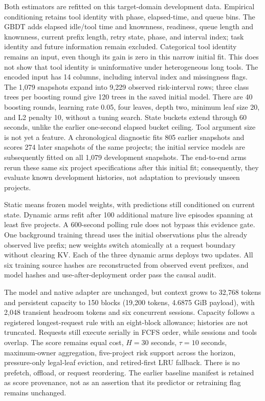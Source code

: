 \documentclass[sigconf, screen, review, balance=false]{acmart}
\begin{document}
Both estimators are refitted on this target-domain development data.
Empirical conditioning retains tool identity with phase, elapsed-time,
and queue bins. The GBDT adds elapsed idle/tool time and knownness,
readiness, queue length and knownness, current prefix length, retry
state, phase, and interval index; task identity and future information
remain excluded. Categorical tool identity remains an input, even
though its gain is zero in this narrow initial fit. This does not show
that tool identity is uninformative under heterogeneous long tools.
The encoded input has 14 columns, including interval index and
missingness flags. The 1,079 snapshots expand into 9,229 observed
risk-interval rows; three class trees per boosting round give
120 trees in the saved initial model.
There are 40 boosting rounds, learning rate 0.05, four leaves, depth two,
minimum leaf size 20, and L2 penalty 10, without a tuning search.
State buckets extend through 60 seconds, unlike the earlier
one-second elapsed bucket ceiling. Tool argument size is not yet a
feature. A chronological diagnostic fits 805 earlier snapshots and
scores 274 later snapshots of the same projects; the initial service
models are subsequently fitted on all 1,079 development snapshots.
The end-to-end arms rerun these same six project specifications after
this initial fit; consequently, they evaluate known development
histories, not adaptation to previously unseen projects.

Static means frozen model weights, with predictions still conditioned
on current state. Dynamic arms refit after 100 additional mature live
episodes spanning at least five projects. A 600-second polling rule
does not bypass this evidence gate. One background training thread uses
the initial observations plus the already observed live prefix; new
weights switch atomically at a request boundary without clearing KV.
Each of the three dynamic arms deploys two updates. All six training
source hashes are reconstructed from observed event prefixes, and
model hashes and use-after-deployment order pass the causal audit.

The model and native adapter are unchanged, but context grows to 32,768
tokens and persistent capacity to 150 blocks (19,200 tokens, 4.6875 GiB
payload), with 2,048 transient headroom tokens and six concurrent
sessions. Capacity follows a registered longest-request rule with an
eight-block allowance; histories are not truncated. Requests still
execute serially in FCFS order, while sessions and tools overlap.
The score remains equal cost, \(H=30\) seconds, \(\tau=10\) seconds,
maximum-owner aggregation, five-project risk support across the
horizon, pressure-only legal-leaf eviction, and retired-first LRU
fallback. There is no prefetch, offload, or request reordering.
The earlier baseline manifest is retained as score provenance, not as
an assertion that its predictor or retraining flag remains unchanged.
\end{document}
